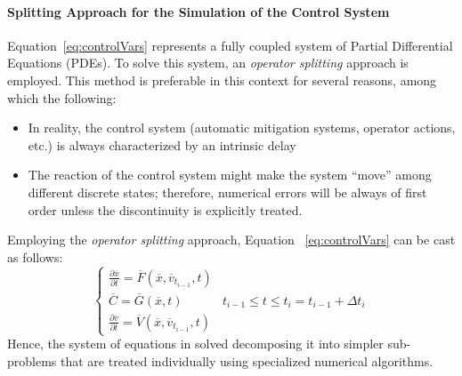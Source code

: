 \paragraph{Splitting Approach for the Simulation of the Control System}
Equation~\ref{eq:controlVars} represents a fully coupled system of Partial Differential 
Equations (PDEs). To solve this system, an  \textit{operator splitting} approach 
is employed. This method is preferable in this context for several reasons, among which the following:
\begin{itemize}
  \item In reality, the control system (automatic mitigation systems, operator actions, 
  etc.) is always characterized by an intrinsic delay
  \item The reaction of the control system might make the system ``move'' among 
  different discrete states; therefore, numerical errors will be always of first order
  unless the discontinuity is explicitly treated.
\end{itemize}
Employing the \textit{operator splitting} approach, Equation ~\ref{eq:controlVars}  can be 
cast as follows: 
\begin{equation}
\label{eq:operatorSplitting}
\left\{\begin{matrix}
\frac{\partial \overline{x} }{\partial t} = \overline{F}\left (  \overline{x},\overline{v}_{t_{i-1}}, t \right )  & \\ 
\overline{C} =  \overline{G}(\overline{x},t)  & t_{i-1} \leq t \leq  t_{i} =  t_{i-1} + \Delta  t_{i}\\ 
\frac{\partial \overline{v} }{\partial t} = \overline{V}\left (  \overline{x}, \overline{v}_{t_{i-1}}, t \right ) & 
\end{matrix}\right.
\end{equation}
Hence, the system of equations in solved decomposing it into simpler sub-problems that are treated individually 
using specialized numerical algorithms.

